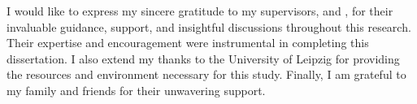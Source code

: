 I would like to express my sincere gratitude to my supervisors, \dissertationsupervisorone{} and \dissertationsupervisortwo, for their invaluable guidance, support, and insightful discussions throughout this research. Their expertise and encouragement were instrumental in completing this dissertation. I also extend my thanks to the University of Leipzig for providing the resources and environment necessary for this study. Finally, I am grateful to my family and friends for their unwavering support.
\blindtext[1] %
